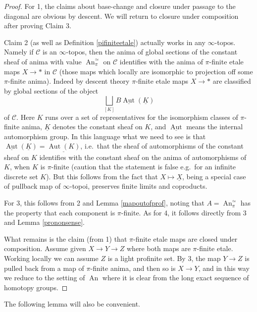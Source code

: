 \documentclass[12pt]{article}
\newcommand{\on}{\operatorname}
\newcommand{\mc}{\mathcal}
\newcommand{\ul}{\underline}
\begin{document}
\begin{proof}
For 1, the claims about base-change and closure under passage to the diagonal are obvious by descent.  We will return to closure under composition after proving Claim 3.

Claim 2 (as well as Definition \ref{pifiniteetale}) actually works in any $\infty$-topos.  Namely if $\mc{C}$ is an $\infty$-topos, then the anima of global sections of the constant sheaf of anima with value $\on{An}^\simeq_\pi$ on $\mc{C}$ identifies with the anima of $\pi$-finite etale maps $X\to \ast$ in $\mc{C}$ (those maps which locally are isomorphic to projection off some $\pi$-finite anima).  Indeed by descent theory $\pi$-finite etale maps $X\to \ast$ are classified by global sections of the object
$$\bigsqcup_{[K]} B\ul{\on{Aut}}(\underline{K})$$
of $\mc{C}$.  Here $K$ runs over a set of representatives for the isomorphism classes of $\pi$-finite anima, $\underline{K}$ denotes the constant sheaf on $K$, and $\ul{\on{Aut}}$ means the internal automorphism group.  In this language what we need to see is that $\ul{\on{Aut}}(\ul{K}) = \ul{\on{Aut}(K)}$, i.e.\ that the sheaf of automorphisms of the constant sheaf on $K$ identifies with the constant sheaf on the anima of automorphisms of $K$, when $K$ is $\pi$-finite (caution that the statement is false e.g.\ for an infinite discrete set $K$).  But this follows from the fact that $X\mapsto \underline{X}$, being a special case of pullback map of $\infty$-topoi, preserves finite limits and coproducts.

For 3, this follows from 2 and Lemma \ref{mapoutofprof}, noting that $A=\on{An}_\pi^\simeq$ has the property that each component is $\pi$-finite. As for 4, it follows directly from 3 and Lemma \ref{prononsense}.

What remains is the claim (from 1) that $\pi$-finite etale maps are closed under composition.  Assume given $X\to Y \to Z$ where both maps are $\pi$-finite etale.  Working locally we can assume $Z$ is a light profinite set.  By 3, the map $Y\to Z$ is pulled back from a map of $\pi$-finite anima, and then so is $X\to Y$, and in this way we reduce to the setting of $\on{An}$ where it is clear from the long exact sequence of homotopy groups.
\end{proof}

The following lemma will also be convenient.
\end{document}
